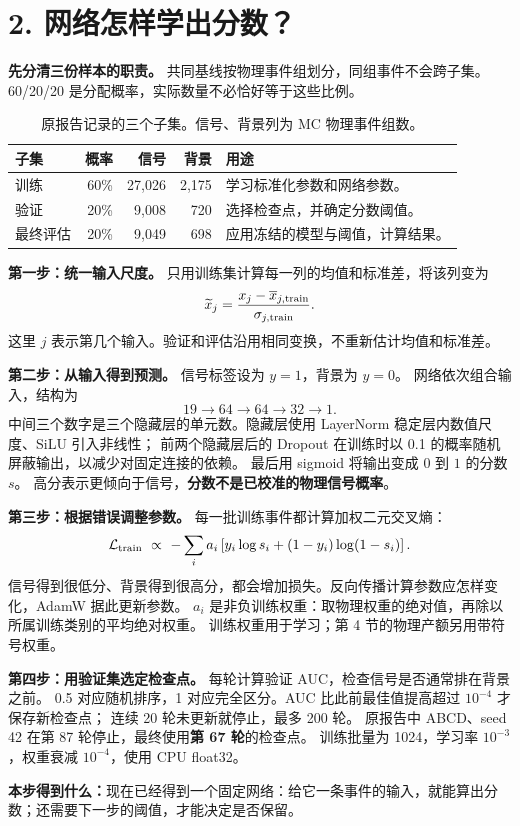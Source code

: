 \documentclass[11pt,a4paper,fontset=fandol,scheme=plain]{ctexart}
\newcommand{\reportsection}[1]{\section*{\textcolor{reportblue}{#1}}}
\newcommand{\takeaway}[1]{\par\medskip\noindent\colorbox{reportblue!7}{\parbox{\dimexpr\linewidth-2\fboxsep\relax}{\textbf{本步得到什么：}#1}}\par}
\begin{document}
\clearpage
\reportsection{2. 网络怎样学出分数？}
\textbf{先分清三份样本的职责。} 共同基线按物理事件组划分，同组事件不会跨子集。
60/20/20 是分配概率，实际数量不必恰好等于这些比例。
\begin{table}[H]
\caption{原报告记录的三个子集。信号、背景列为 MC 物理事件组数。}
\small
\renewcommand{\arraystretch}{1.2}
\begin{tabularx}{\linewidth}{@{}lrrrY@{}}
\toprule
子集 & 概率 & 信号 & 背景 & 用途 \\
\midrule
训练 & 60\% & 27,026 & 2,175 & 学习标准化参数和网络参数。\\
验证 & 20\% & 9,008 & 720 & 选择检查点，并确定分数阈值。\\
最终评估 & 20\% & 9,049 & 698 & 应用冻结的模型与阈值，计算结果。\\
\bottomrule
\end{tabularx}
\end{table}

\textbf{第一步：统一输入尺度。} 只用训练集计算每一列的均值和标准差，将该列变为
\[
 \widetilde{x}_j=\frac{x_j-\overline{x}_{j,\rm train}}{\sigma_{j,\rm train}}.
\]
这里 $j$ 表示第几个输入。验证和评估沿用相同变换，不重新估计均值和标准差。

\textbf{第二步：从输入得到预测。} 信号标签设为 $y=1$，背景为 $y=0$。
网络依次组合输入，结构为
\[
 19\longrightarrow64\longrightarrow64\longrightarrow32\longrightarrow1.
\]
中间三个数字是三个隐藏层的单元数。隐藏层使用 LayerNorm 稳定层内数值尺度、SiLU 引入非线性；
前两个隐藏层后的 Dropout 在训练时以 0.1 的概率随机屏蔽输出，以减少对固定连接的依赖。
最后用 sigmoid 将输出变成 $0$ 到 $1$ 的分数 $s$。
高分表示更倾向于信号，\textbf{分数不是已校准的物理信号概率}。

\textbf{第三步：根据错误调整参数。} 每一批训练事件都计算加权二元交叉熵：
\[
 \mathcal L_{\rm train}\ \propto\ -\sum_i a_i\left[y_i\log s_i+(1-y_i)\log(1-s_i)\right].
\]
信号得到很低分、背景得到很高分，都会增加损失。反向传播计算参数应怎样变化，AdamW 据此更新参数。
$a_i$ 是非负训练权重：取物理权重的绝对值，再除以所属训练类别的平均绝对权重。
训练权重用于学习；第 4 节的物理产额另用带符号权重。

\textbf{第四步：用验证集选定检查点。} 每轮计算验证 AUC，检查信号是否通常排在背景之前。
0.5 对应随机排序，1 对应完全区分。AUC 比此前最佳值提高超过 $10^{-4}$ 才保存新检查点；
连续 20 轮未更新就停止，最多 200 轮。
原报告中 ABCD、seed 42 在第 87 轮停止，最终使用\textbf{第 67 轮}的检查点。
训练批量为 1024，学习率 $10^{-3}$，权重衰减 $10^{-4}$，使用 CPU float32。
\takeaway{现在已经得到一个固定网络：给它一条事件的输入，就能算出分数；还需要下一步的阈值，才能决定是否保留。}
\end{document}
